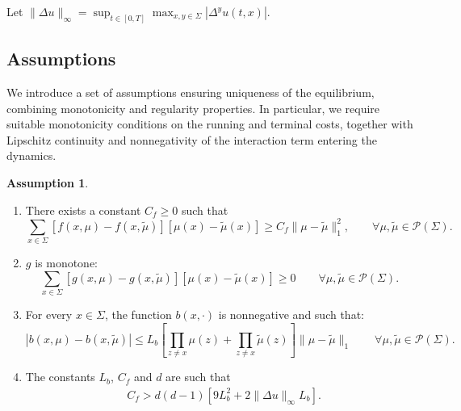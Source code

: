 \documentclass[11pt,a4paper]{amsart}
\theoremstyle{definition}
\newtheorem*{assumption}{Assumption}
\newcommand{\norm}[1]{\|#1\|}
\newcommand{\calP}{\mathcal{P}}
\begin{document}
Let $\norm{\Delta u}_\infty = \sup_{t \in [0,T]} \max_{x,y \in \Sigma} |\Delta^y u(t,x)|$. 


\subsection{Assumptions}\label{sec:assumptions}

We introduce a set of assumptions ensuring uniqueness of the equilibrium, combining monotonicity and regularity properties. In particular, we require suitable monotonicity conditions on the running and terminal costs, together with Lipschitz continuity and nonnegativity of the interaction term entering the dynamics.
\begin{assumption}\label{ass:uniqueness}
    ~
    \begin{enumerate}
        \item[(A1)] There exists a constant $C_f \ge 0$ such that
        \begin{equation*}
            \sum_{x \in \Sigma} [f(x,\mu) - f(x,\tilde{\mu})][\mu(x) - \tilde{\mu}(x)] \ge C_f \norm{\mu - \tilde{\mu}}_1^2, \qquad \forall \mu, \tilde{\mu} \in \calP(\Sigma).
        \end{equation*}
        \item[(A2)] $g$ is monotone: 
        \begin{equation*}
            \sum_{x \in \Sigma} [g(x,\mu) -g(x,\tilde{\mu})][\mu(x) - \tilde{\mu}(x)] \geq 0 \qquad \forall \mu, \tilde{\mu} \in \calP(\Sigma).
        \end{equation*}
        \item[(A3)] For every $x \in \Sigma$, the function $b(x,\cdot)$ is nonnegative and such that:
        \begin{equation*}
            |b(x,\mu) - b(x,\tilde{\mu})| \leq L_{b} \left[\prod_{z \neq x} \mu(z) + \prod_{z \neq x} \tilde{\mu}(z) \right] \norm{\mu - \tilde{\mu}}_{1} \qquad \forall \mu, \tilde{\mu} \in \calP(\Sigma).
        \end{equation*}
        \item[(A4)] The constants $L_b$, $C_f$ and $d$ are such that
        \begin{align*}
            &C_f > d(d-1) [9 L_b^2 + 2 \norm{\Delta u}_\infty L_b].
        \end{align*}
    \end{enumerate}
\end{assumption}
\end{document}
